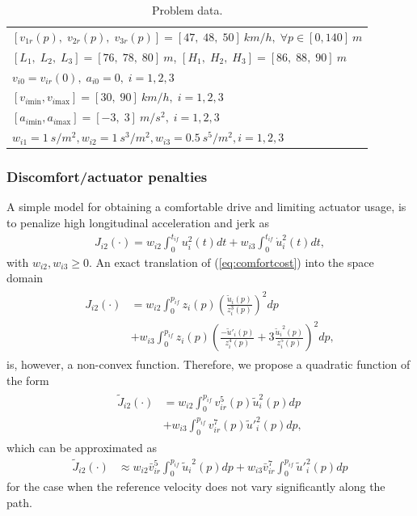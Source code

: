 \documentclass[letterpaper,10pt,conference]{ieeeconf}
\begin{document}
\begin{table}[b]
\caption{Problem data.}
\begin{center}
\begin{tabular}{l}
\hline
$[v_{1r}(p), \; v_{2r}(p), \; v_{3r}(p)]=[47, \; 48, \; 50]\SI{}{km/h}, \; \forall p\in[0,140]\SI{}{m}$ \\
$[L_1, \; L_2, \; L_3]=[76,\; 78,\;80]\SI{}{m}$, \; $[H_1, \; H_2, \; H_3]=[86,\; 88,\;90]\SI{}{m}$ \\
$v_{i0}=v_{ir}(0), \; a_{i0}=0, \; i=1,2,3$ \\
$[v_{i\text{min}}, v_{i\text{max}}]=[30, \;90]\SI{}{km/h}, \; i=1,2,3$ \\
$[a_{i\text{min}}, a_{i\text{max}}]=[-3, \;3]\SI{}{m/s^2}, \; i=1,2,3$ \\
$w_{i1}=\SI{1}{s/m^2}, w_{i2}=\SI{1}{s^3/m^2}, w_{i3}=\SI{0.5}{s^5/m^2}, i=1,2,3$ \\
\hline
\end{tabular}
\end{center}
\label{tab:problemdata} %
\end{table}


\subsubsection{Discomfort/actuator penalties} A simple model for obtaining a comfortable drive and limiting actuator usage, is to penalize high longitudinal acceleration and jerk as
\begin{align} \label{eq:comfortcost}
J_{i2}(\cdot)=w_{i2} \int_0^{t_{if}} u_i^2(t) dt + w_{i3} \int_0^{t_{if}}\dot u_i^2(t) dt,
\end{align}
with $w_{i2}, w_{i3} \geq 0$. An exact translation of (\ref{eq:comfortcost}) into the space domain
\begin{align} \label{eq:comfortcost2}
\begin{split}
J_{i2}(\cdot)&=w_{i2} \int_0^{p_{if}} z_i(p)\left(\frac{\tilde u_i(p)}{z_i^3(p)}\right)^2 dp \\
& + w_{i3} \int_0^{p_{if}} z_i(p)\left(\frac{-\tilde u'_i(p)}{z_i^4(p)} + 3\frac{{\tilde u_i}^2(p)}{z_i^5(p)} \right)^2 dp,
\end{split}
\end{align}
is, however, a non-convex function. Therefore, we propose a quadratic function of the form
\begin{align} \label{eq:comfortcost3}
\begin{split}
\tilde J_{i2}(\cdot)&=w_{i2} \int_0^{p_{if}} v_{ir}^5(p) \tilde u_i^2(p) dp\\
&+ w_{i3} \int_0^{p_{if}} v_{ir}^7(p) \tilde u'^2_i(p) dp,
\end{split}
\end{align}
which can be approximated as 
\begin{align} \label{eq:comfortcost4}
\tilde J_{i2}(\cdot)&\approx w_{i2} \bar v_{ir}^5  \int_0^{p_{if}} {\tilde u_i}^2(p) dp+ w_{i3} \bar v_{ir}^7 \int_0^{p_{if}} \tilde u'^2_i(p) dp
\end{align} 
for the case when the reference velocity does not vary significantly along the path.
\end{document}
